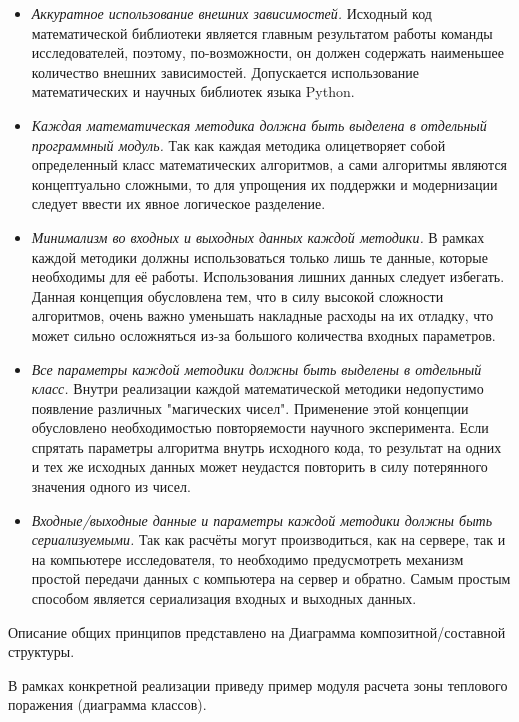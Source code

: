 \begin{itemize}
    \item {
        \textit{Аккуратное использование внешних зависимостей.}
        Исходный код математической библиотеки является главным результатом работы команды исследователей,
        поэтому, по-возможности, он должен содержать наименьшее количество внешних зависимостей.
        Допускается использование математических и научных библиотек языка Python.
    }
    \item {
        \textit{Каждая математическая методика должна быть выделена в отдельный программный модуль.}
        Так как каждая методика олицетворяет собой определенный класс математических алгоритмов,
        а сами алгоритмы являются концептуально сложными, то для упрощения их поддержки и модернизации
        следует ввести их явное логическое разделение.
    }
    \item {
        \textit{Минимализм во входных и выходных данных каждой методики.}
        В рамках каждой методики должны использоваться только лишь те данные, которые необходимы для её работы.
        Использования лишних данных следует избегать.
        Данная концепция обусловлена тем, что в силу высокой сложности алгоритмов,
        очень важно уменьшать накладные расходы на их отладку, что может сильно осложняться
        из-за большого количества входных параметров.
    }
    \item {
        \textit{Все параметры каждой методики должны быть выделены в отдельный класс.}
        Внутри реализации каждой математической методики недопустимо появление различных "магических чисел".
        Применение этой концепции обусловлено необходимостью повторяемости научного эксперимента.
        Если спрятать параметры алгоритма внутрь исходного кода, то результат на одних и тех же исходных данных
        может неудастся повторить в силу потерянного значения одного из чисел.
    }
    \item {
        \textit{Входные/выходные данные и параметры каждой методики должны быть сериализуемыми.}
        Так как расчёты могут производиться, как на сервере, так и на компьютере исследователя, то необходимо
        предусмотреть механизм простой передачи данных с компьютера на сервер и обратно. Самым простым способом
        является сериализация входных и выходных данных.
    }
\end{itemize}

Описание общих принципов представлено на Диаграмма композитной/составной структуры.

В рамках конкретной реализации приведу пример модуля расчета зоны теплового поражения (диаграмма классов).
